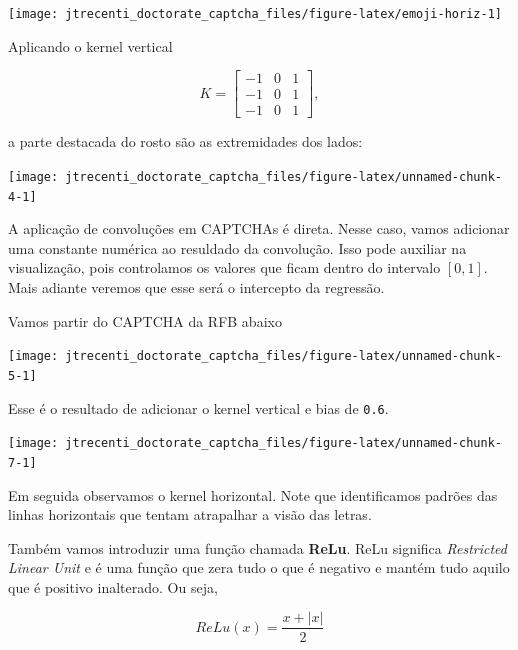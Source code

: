 \documentclass[12pt,]{report}
\let\origfigure\figure
\let\endorigfigure\endfigure
\renewenvironment{figure}[1][2] {
    \expandafter\origfigure\expandafter[H]
} {
    \endorigfigure
}
\begin{document}
\begin{figure}

{\centering \texttt{[image: jtrecenti\_doctorate\_captcha\_files/figure-latex/emoji-horiz-1]} 

}

\caption{Figura após aplicação de convolução.}\label{fig:emoji-horiz}
\end{figure}

Aplicando o kernel vertical

\[
K = \left[\begin{array}{rrr}-1&0&1\\-1&0&1\\-1&0&1\end{array}\right],
\]

a parte destacada do rosto são as extremidades dos lados:

\begin{center}\texttt{[image: jtrecenti\_doctorate\_captcha\_files/figure-latex/unnamed-chunk-4-1]} \end{center}

A aplicação de convoluções em CAPTCHAs é direta. Nesse caso, vamos
adicionar uma constante numérica ao resuldado da convolução. Isso pode
auxiliar na visualização, pois controlamos os valores que ficam dentro
do intervalo \([0,1]\). Mais adiante veremos que esse será o intercepto
da regressão.

Vamos partir do CAPTCHA da RFB abaixo

\begin{center}\texttt{[image: jtrecenti\_doctorate\_captcha\_files/figure-latex/unnamed-chunk-5-1]} \end{center}

Esse é o resultado de adicionar o kernel vertical e bias de
\texttt{0.6}.

\begin{center}\texttt{[image: jtrecenti\_doctorate\_captcha\_files/figure-latex/unnamed-chunk-7-1]} \end{center}

Em seguida observamos o kernel horizontal. Note que identificamos
padrões das linhas horizontais que tentam atrapalhar a visão das letras.

Também vamos introduzir uma função chamada \textbf{ReLu}. ReLu significa
\emph{Restricted Linear Unit} e é uma função que zera tudo o que é
negativo e mantém tudo aquilo que é positivo inalterado. Ou seja,

\[
ReLu(x) = \frac{x + |x|}{2}
\]
\end{document}

